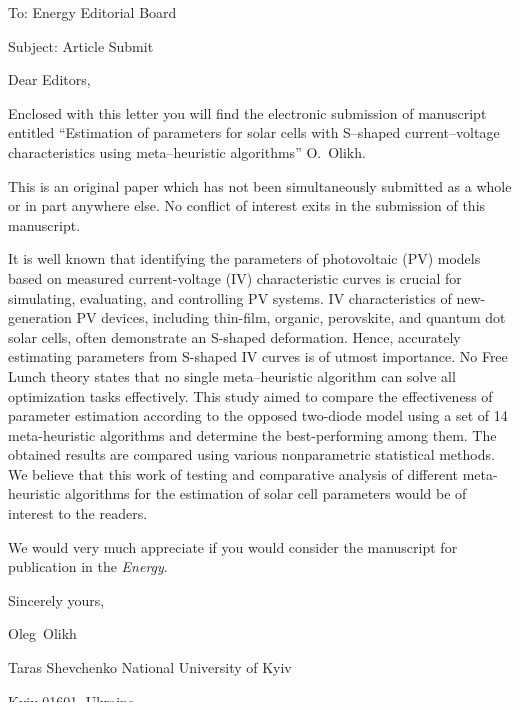\documentclass[preprint]{elsarticle}
\begin{document}
To:
Energy Editorial Board


Subject:
Article Submit

\vspace{5mm}
Dear Editors,

\vspace{3mm}
Enclosed with this letter you will find the electronic submission of manuscript entitled
``Estimation of parameters for solar cells with S--shaped current--voltage characteristics using meta--heuristic algorithms'' O.~Olikh.



This is an original paper which has not been simultaneously submitted as a whole or in part anywhere else.
No conflict of interest exits in the submission of this manuscript.


It is well known that identifying the parameters of photovoltaic (PV) models based on measured current-voltage (IV) characteristic curves
is crucial for simulating, evaluating, and controlling PV systems.
IV characteristics of new-generation PV devices,
including thin-film, organic, perovskite, and quantum dot solar cells, often demonstrate an S-shaped deformation.
Hence, accurately estimating parameters from S-shaped IV curves is of utmost importance.
No Free Lunch theory states that no single meta--heuristic algorithm can solve all optimization tasks effectively.
This study aimed to compare the effectiveness of parameter estimation according to the opposed two-diode model
using a set of 14 meta-heuristic algorithms and determine the best-performing among them.
The obtained results are compared using various nonparametric statistical methods.
We believe that this work of testing and comparative analysis of different meta-heuristic algorithms for the estimation of solar cell parameters
would be of interest to the readers.


We would  very much appreciate if you would consider the manuscript for publication in the \emph{Energy}.

\vspace{3mm}

Sincerely yours,

Oleg~Olikh


Taras Shevchenko National University of Kyiv


Kyiv 01601, Ukraine

E-mail: olegolikh@knu.ua


\end{document}
